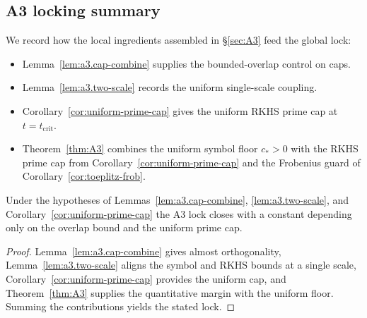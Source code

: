 \subsection{A3 locking summary}\label{a3:sec:locks}

We record how the local ingredients assembled in \S\ref{sec:A3} feed the global lock:

\begin{itemize}
  \item Lemma~\ref{lem:a3.cap-combine} supplies the bounded-overlap control on caps.
  \item Lemma~\ref{lem:a3.two-scale} records the uniform single-scale coupling.
  \item Corollary~\ref{cor:uniform-prime-cap} gives the uniform RKHS prime cap at $t=t_{\mathrm{crit}}$.
  \item Theorem~\ref{thm:A3} combines the uniform symbol floor $c_*>0$ with the RKHS prime cap from Corollary~\ref{cor:uniform-prime-cap} and the Frobenius guard of Corollary~\ref{cor:toeplitz-frob}.
\end{itemize}

\begin{corollary}[Lock]\label{cor:D3-lock}
Under the hypotheses of Lemmas~\ref{lem:a3.cap-combine}, \ref{lem:a3.two-scale}, and Corollary~\ref{cor:uniform-prime-cap} the A3 lock closes with a constant depending only on the overlap bound and the uniform prime cap.
\end{corollary}
\label{a3:cor:A3_lock_formal}

\begin{proof}
Lemma~\ref{lem:a3.cap-combine} gives almost orthogonality, Lemma~\ref{lem:a3.two-scale}
aligns the symbol and RKHS bounds at a single scale, Corollary~\ref{cor:uniform-prime-cap} provides the uniform cap,
and Theorem~\ref{thm:A3} supplies the quantitative margin with the uniform floor.
Summing the contributions yields the stated lock.
\end{proof}
